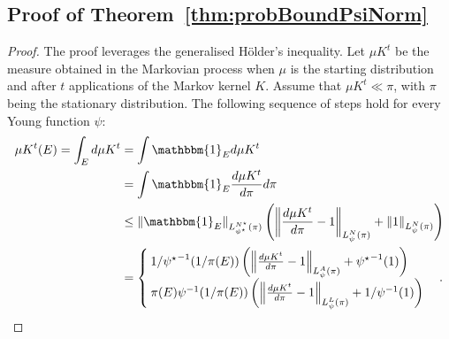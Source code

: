 \documentclass[11pt]{article}
\theoremstyle{plain}
\theoremstyle{remark}
\begin{document}
\subsection{Proof of Theorem~\ref{thm:probBoundPsiNorm}}\label{app:proofProbBoundPsiNorm}
    \begin{proof}
        The proof leverages the generalised H\"older's inequality. Let $\mu K^t$ be the measure obtained in the Markovian process when $\mu$ is the starting distribution and after $t$ applications of the Markov kernel $K$. Assume that $\mu K^t \ll \pi$, with $\pi$ being the stationary distribution. 
The following sequence of steps hold for every Young function $\psi$:
\begin{align}
    \mu K^t(E) = \int_E d\mu K^t &= \int \mathbbm{1}_E  d\mu K^t\\
               &= \int \mathbbm{1}_E  \frac{d\mu K^t}{d\pi} d\pi \\
               &\leq \left\lVert \mathbbm{1}_E\right\rVert_{L_{{\psi}^\star}^{N^\star}(\pi)}\left(\left\lVert \frac{d\mu K^t}{d\pi}-1\right\rVert_{L_\psi^N(\pi)}+\left\lVert 1\right\rVert_{L_\psi^N(\pi)}\right) \\
               &=\begin{cases}
                   1/{\psi^\star}^{-1}(1/\pi(E))\left(\left\lVert \frac{d\mu K^t}{d\pi}-1\right\rVert_{L_\psi^A(\pi)}+{\psi^\star}^{-1}(1)\right) \\
                   \pi(E)\psi^{-1}(1/\pi(E))\left(\left\lVert \frac{d\mu K^t}{d\pi}-1\right\rVert_{L_\psi^L(\pi)}+1/\psi^{-1}(1)\right)
               \end{cases}.
\end{align}

    \end{proof}
\end{document}
